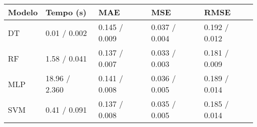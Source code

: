 \begin{tabular}{lllll}
\toprule
Modelo & Tempo (s) & MAE & MSE & RMSE \\
\midrule
DT & 0.01 / 0.002 & 0.145 / 0.009 & 0.037 / 0.004 & 0.192 / 0.012 \\
RF & 1.58 / 0.041 & 0.137 / 0.007 & 0.033 / 0.003 & 0.181 / 0.009 \\
MLP & 18.96 / 2.360 & 0.141 / 0.008 & 0.036 / 0.005 & 0.189 / 0.014 \\
SVM & 0.41 / 0.091 & 0.137 / 0.008 & 0.035 / 0.005 & 0.185 / 0.014 \\
\bottomrule
\end{tabular}
